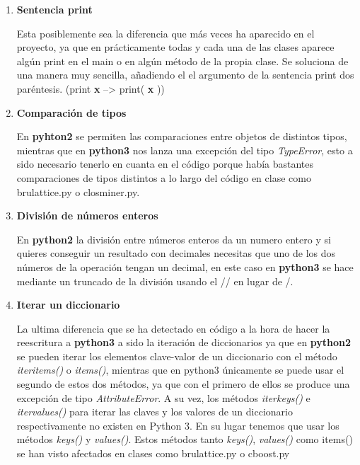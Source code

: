 \documentclass{cosas/tfg_domingo}
\begin{document}
\begin{enumerate}
    \item \textbf{Sentencia print}
    
    Esta posiblemente sea la diferencia que más veces ha aparecido en el proyecto, ya que en prácticamente todas y cada una de las clases aparece algún print en el main o en algún método de la propia clase.
    Se soluciona de una manera muy sencilla, añadiendo el el argumento de la sentencia print dos paréntesis. (print \textbf{x} --> print( \textbf{x} ))
    
    \item \textbf{Comparación de tipos}
    
    En \textbf{pyhton2} se permiten las comparaciones entre objetos de distintos tipos, mientras que en \textbf{python3} nos lanza una excepción del tipo \textit{TypeError}, esto a sido necesario tenerlo en cuanta en el código porque había bastantes comparaciones de tipos distintos a lo largo del código en clase como brulattice.py o closminer.py.
    
    \item \textbf{División de números enteros}
    
    En \textbf{python2} la división entre números enteros da un numero entero y si quieres conseguir un resultado con decimales necesitas que uno de los dos números de la operación tengan un decimal, en este caso en \textbf{python3} se hace mediante un truncado de la división usando el // en lugar de /.
    
    \item \textbf{Iterar un diccionario}
    
    La ultima diferencia que se ha detectado en código a la hora de hacer la reescritura a \textbf{python3} a sido la iteración de diccionarios ya que en \textbf{python2} se pueden iterar los elementos clave-valor de un diccionario con el método \textit{iteritems()} o \textit{items()}, mientras que en python3 únicamente se puede usar el segundo de estos dos métodos, ya que con el primero de ellos se produce una excepción de tipo \textit{AttributeError}.
    A su vez, los métodos \textit{iterkeys()} e \textit{itervalues()} para iterar las claves y los valores de un diccionario respectivamente no existen en Python 3. En su lugar tenemos que usar los métodos \textit{keys()} y \textit{values()}. Estos métodos tanto \textit{keys()}, \textit{values()} como items() se han visto afectados en clases como brulattice.py o cboost.py
    
\end{enumerate}
\end{document}
